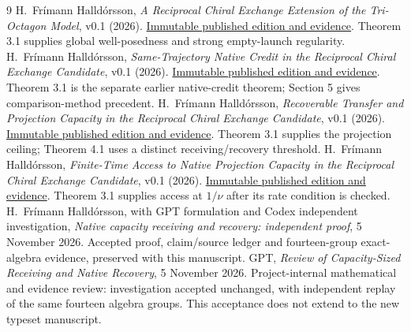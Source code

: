 \clearpage
\begin{thebibliography}{9}
H.~Fr\'imann Halld\'orsson,
\emph{A Reciprocal Chiral Exchange Extension of the Tri-Octagon Model},
v0.1 (2026).
\href{https://github.com/pzychozen/trioctagon-physics/tree/273b1a6faaab19ea58748d00576439166eeef9ab/papers/RECIPROCAL_CHIRAL_EXCHANGE/publication/v0.1}{Immutable published edition and evidence}.
Theorem 3.1 supplies global well-posedness and strong empty-launch regularity.
H.~Fr\'imann Halld\'orsson,
\emph{Same-Trajectory Native Credit in the Reciprocal Chiral Exchange Candidate},
v0.1 (2026).
\href{https://github.com/pzychozen/trioctagon-physics/tree/28e8a85c8fe1e6321328d4d7285b2560d1f98aa9/papers/SAME_TRAJECTORY_NATIVE_CREDIT/publication/v0.1}{Immutable published edition and evidence}.
Theorem 3.1 is the separate earlier native-credit theorem; Section 5 gives comparison-method precedent.
H.~Fr\'imann Halld\'orsson,
\emph{Recoverable Transfer and Projection Capacity in the Reciprocal Chiral Exchange Candidate},
v0.1 (2026).
\href{https://github.com/pzychozen/trioctagon-physics/tree/54c0f6c419fa681e2c1e74a5ad2bb46df787bb93/papers/RECOVERABLE_TRANSFER_AND_PROJECTION_CAPACITY/publication/v0.1}{Immutable published edition and evidence}.
Theorem 3.1 supplies the projection ceiling; Theorem 4.1 uses a distinct receiving/recovery threshold.
H.~Fr\'imann Halld\'orsson,
\emph{Finite-Time Access to Native Projection Capacity in the Reciprocal Chiral Exchange Candidate},
v0.1 (2026).
\href{https://github.com/pzychozen/trioctagon-physics/tree/bcfffc64ac5a62290763041b3cbe6fcac2fdbfb6/papers/NATIVE_FINITE_CAPACITY_ACCESS/publication/v0.1}{Immutable published edition and evidence}.
Theorem 3.1 supplies access at $1/\nu$ after its rate condition is checked.
H.~Fr\'imann Halld\'orsson, with GPT formulation and Codex independent investigation,
\emph{Native capacity receiving and recovery: independent proof},
5 November 2026.
Accepted proof, claim/source ledger and fourteen-group exact-algebra evidence, preserved with this manuscript.
GPT, \emph{Review of Capacity-Sized Receiving and Native Recovery},
5 November 2026.
Project-internal mathematical and evidence review: investigation accepted unchanged, with independent replay of the same fourteen algebra groups. This acceptance does not extend to the new typeset manuscript.
\end{thebibliography}
